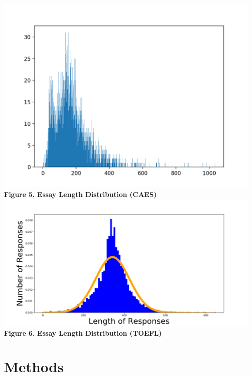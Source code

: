 \documentclass[11pt,a4paper]{article}
\begin{document}
\begin{center}
	\includegraphics[scale=0.5]{lengthD}\\
	\textbf{Figure 5. Essay Length Distribution (CAES)}
	\includegraphics[scale=0.25]{Figure1}\\
	\textbf{Figure 6. Essay Length Distribution (TOEFL)}
\end{center}


\section{Methods}
\end{document}
